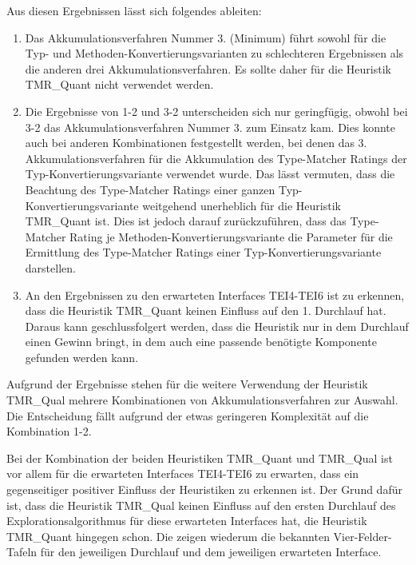 Aus diesen Ergebnissen lässt sich folgendes ableiten:
\begin{enumerate}
\item Das Akkumulationsverfahren Nummer 3. (Minimum) führt sowohl für die Typ- und Methoden-Konvertierungsvarianten zu schlechteren Ergebnissen als die anderen drei Akkumulationsverfahren. Es sollte daher für die Heuristik TMR\_Quant nicht verwendet werden.
\item Die Ergebnisse von 1-2 und 3-2 unterscheiden sich nur geringfügig, obwohl bei 3-2 das Akkumulationsverfahren Nummer 3. zum Einsatz kam. Dies konnte auch bei anderen Kombinationen festgestellt werden, bei denen das 3. Akkumulationsverfahren für die Akkumulation des Type-Matcher Ratings der Typ-Konvertierungsvariante verwendet wurde. Das lässt vermuten, dass die Beachtung des Type-Matcher Ratings einer ganzen Typ-Konvertierungsvariante weitgehend unerheblich für die Heuristik TMR\_Quant ist.
Dies ist jedoch darauf zurückzuführen, dass das Type-Matcher Rating je Methoden-Konvertierungsvariante die Parameter für die Ermittlung des Type-Matcher Ratings einer Typ-Konvertierungsvariante darstellen.
\item An den Ergebnissen zu den erwarteten Interfaces TEI4-TEI6 ist zu erkennen, dass die Heuristik TMR\_Quant keinen Einfluss auf den 1. Durchlauf hat. Daraus kann geschlussfolgert werden, dass die Heuristik nur in dem Durchlauf einen Gewinn bringt, in dem auch eine passende benötigte Komponente gefunden werden kann. 
\end{enumerate}
Aufgrund der Ergebnisse stehen für die weitere Verwendung der Heuristik TMR\_Qual mehrere Kombinationen von Akkumulationsverfahren zur Auswahl. Die Entscheidung fällt aufgrund der etwas geringeren Komplexität auf die Kombination 1-2. 

Bei der Kombination der beiden Heuristiken TMR\_Quant und TMR\_Qual ist vor allem für die erwarteten Interfaces TEI4-TEI6 zu erwarten, dass ein gegenseitiger positiver Einfluss der Heuristiken zu erkennen ist. Der Grund dafür ist, dass die Heuristik TMR\_Qual keinen Einfluss auf den ersten Durchlauf des Explorationsalgorithmus für diese erwarteten Interfaces hat, die Heuristik TMR\_Quant hingegen schon. Die  zeigen wiederum die bekannten Vier-Felder-Tafeln für den jeweiligen Durchlauf und dem jeweiligen erwarteten Interface.
\begin{multicols}{3}
\columnbreak
{}\columnbreak
{}
\end{multicols}

